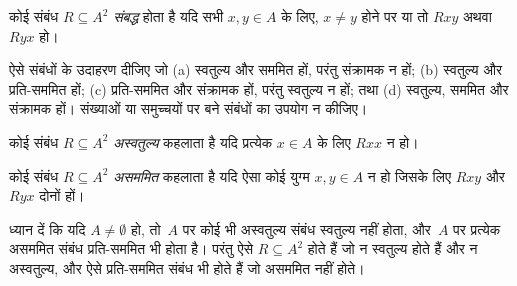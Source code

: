 \documentclass[../../../include/open-logic-section]{subfiles}
\begin{document}
\begin{defn}[संबद्धता]
कोई संबंध $R \subseteq A^2$ \emph{संबद्ध} होता है यदि सभी $x,y\in
A$ के लिए, $x \neq y$ होने पर या तो $Rxy$ अथवा~$Ryx$ हो।
\end{defn}

\begin{prob}
ऐसे संबंधों के उदाहरण दीजिए जो (a) स्वतुल्य और सममित हों, परंतु संक्रामक
न हों; (b) स्वतुल्य और प्रति-सममित हों; (c) प्रति-सममित और संक्रामक हों,
परंतु स्वतुल्य न हों; तथा (d) स्वतुल्य, सममित और संक्रामक हों। संख्याओं या
समुच्चयों पर बने संबंधों का उपयोग न कीजिए।
\end{prob} 
 
\begin{defn}[अस्वतुल्यता]
कोई संबंध $R \subseteq A^2$ \emph{अस्वतुल्य} कहलाता है यदि प्रत्येक $x \in
A$ के लिए $Rxx$ न हो। 
\end{defn}

\begin{defn}[असममिति]
कोई संबंध $R \subseteq A^2$ \emph{असममित} कहलाता है यदि ऐसा कोई युग्म $x,y\in
A$ न हो जिसके लिए $Rxy$ और~$Ryx$ दोनों हों। 
\end{defn}

ध्यान दें कि यदि $A \neq \emptyset$ हो, तो~$A$ पर कोई भी अस्वतुल्य संबंध
स्वतुल्य नहीं होता, और~$A$ पर प्रत्येक असममित संबंध प्रति-सममित भी होता है।
परंतु ऐसे $R \subseteq A^2$ होते हैं जो न स्वतुल्य होते हैं और न अस्वतुल्य,
और ऐसे प्रति-सममित संबंध भी होते हैं जो असममित नहीं होते। 
\end{document}
